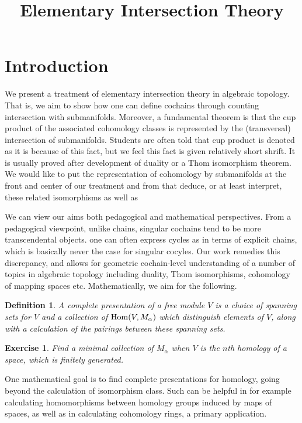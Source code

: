 \documentclass{amsart}          %
\newtheorem{definition}[theorem]{Definition}
\newtheorem{exercise}[theorem]{Exercise}
\begin{document}
\title{Elementary Intersection Theory}
\maketitle

\section{Introduction}

We present a treatment of elementary intersection theory in algebraic topology.  
That is, we aim to show how one can  
define cochains through counting intersection with submanifolds.  
Moreover, a fundamental theorem is that the cup product of the associated
 cohomology classes is represented by the (transversal) intersection of submanifolds.  
 Students are often told that cup product is denoted as it is because of this 
 fact, but we feel this fact is given relatively short shrift.  It is usually proved after development of duality or a Thom isomorphism theorem.  
 We would like to put the representation of cohomology by submanifolds at the front and center of our treatment and from that deduce, 
 or at least interpret, these related isomorphisms as well as 

We can view our aims both pedagogical and mathematical perspectives.
From a pedagogical  viewpoint, unlike chains, singular cochains tend to be more transcendental objects.  
 one can often express cycles as in terms of explicit chains, which is basically never the case 
for singular cocyles.  Our work remedies this discrepancy, and  allows for geometric cochain-level understanding of a 
number of topics in algebraic topology including duality, Thom isomorphisms, cohomology of mapping spaces etc.   
Mathematically, we aim for the following.

\begin{definition}
A complete presentation of a free module $V$ is a choice of spanning sets for $V$ and a collection of ${\rm Hom}(V, M_\alpha)$
which distinguish elements of $V$, along with a calculation of the pairings between these spanning sets.
\end{definition}

\begin{exercise}
Find a minimal collection of $M_\alpha$ when $V$ is the $n$th homology of  a space, which is finitely generated.
\end{exercise}

One mathematical goal is to find complete presentations for homology, going beyond the calculation of isomorphism class.  
Such can be helpful in for example calculating homomorphisms between homology groups induced by maps of spaces,
as well as in calculating cohomology rings, a primary application.  
\end{document}
